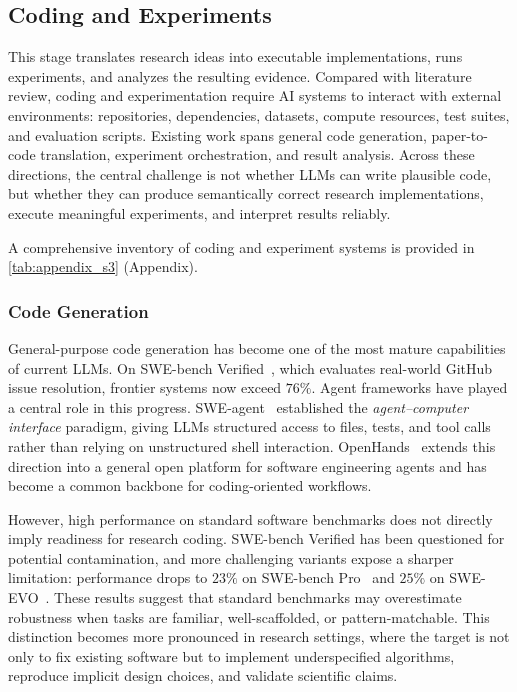 \documentclass{llmxive}
\begin{document}
\subsection{Coding and Experiments}
\label{sec:experiment}

This stage translates research ideas into executable implementations, runs experiments, and analyzes the resulting evidence. Compared with literature review, coding and experimentation require AI systems to interact with external environments: repositories, dependencies, datasets, compute resources, test suites, and evaluation scripts. Existing work spans general code generation, paper-to-code translation, experiment orchestration, and result analysis. Across these directions, the central challenge is not whether LLMs can write plausible code, but whether they can produce semantically correct research implementations, execute meaningful experiments, and interpret results reliably. 

A comprehensive inventory of coding and experiment systems is provided in \cref{tab:appendix_s3} (Appendix).



\subsubsection{Code Generation}
\label{sec:code_gen}

General-purpose code generation has become one of the most mature capabilities of current LLMs. On SWE-bench Verified~\cite{swebench2024_leaderboard}, which evaluates real-world GitHub issue resolution, frontier systems now exceed $76\%$. Agent frameworks have played a central role in this progress. SWE-agent~\cite{yang2024sweagent} established the \emph{agent--computer interface} paradigm, giving LLMs structured access to files, tests, and tool calls rather than relying on unstructured shell interaction. OpenHands~\cite{wang2024openhands} extends this direction into a general open platform for software engineering agents and has become a common backbone for coding-oriented workflows.

However, high performance on standard software benchmarks does not directly imply readiness for research coding. SWE-bench Verified has been questioned for potential contamination, and more challenging variants expose a sharper limitation: performance drops to $23\%$ on SWE-bench Pro~\cite{deng2025swebenchpro} and $25\%$ on SWE-EVO~\cite{thai2025sweevo}. These results suggest that standard benchmarks may overestimate robustness when tasks are familiar, well-scaffolded, or pattern-matchable. This distinction becomes more pronounced in research settings, where the target is not only to fix existing software but to implement underspecified algorithms, reproduce implicit design choices, and validate scientific claims.
\end{document}
